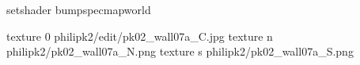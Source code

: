 setshader bumpspecmapworld

texture 0 philipk2/edit/pk02_wall07a_C.jpg
texture n philipk2/pk02_wall07a_N.png
texture s philipk2/pk02_wall07a_S.png


